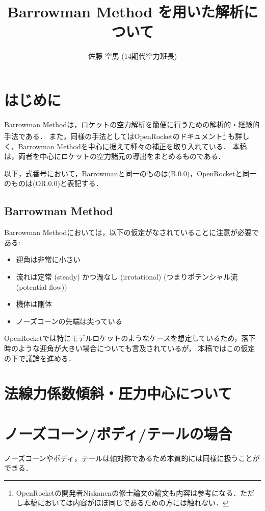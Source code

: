 \documentclass[uplatex,dvipdfmx,a4j,11pt]{jsarticle}
\title{Barrowman Method を用いた解析について}
\date{}
\author{佐藤 空馬 (14期代空力班長)}
\begin{document}
\maketitle
\thispagestyle{mypagestyle}%

\section{はじめに}
Barrowman Method\cite{Barrowman}は，ロケットの空力解析を簡便に行うための解析的・経験的手法である．
また，同様の手法としてはOpenRocketのドキュメント\cite{OpenRocket1}\footnote{OpenRocketの開発者Niskanenの修士論文\cite{OpenRocket2}の論文も内容は参考になる．ただし本稿においては内容がほぼ同じであるため\cite{OpenRocket2}の方には触れない．}
も詳しく，Barrowman Methodを中心に据えて種々の補正を取り入れている．
本稿は，両者を中心にロケットの空力諸元の導出をまとめるものである．

以下，式番号において，Barrowman\cite{Barrowman}と同一のものは(B.0.0)，OpenRocket\cite{OpenRocket1}と同一のものは(OR.0.0)と表記する．

\subsection{Barrowman Method}
Barrowman Methodにおいては，以下の仮定がなされていることに注意が必要である:
\begin{itemize}
  \item 迎角は非常に小さい
  \item 流れは定常 (steady) かつ渦なし (irrotational) (つまりポテンシャル流 (potential flow))
  \item 機体は剛体
  \item ノーズコーンの先端は尖っている
\end{itemize}
OpenRocketでは特にモデルロケットのようなケースを想定しているため，落下時のような迎角が大きい場合についても言及されているが，
本稿ではこの仮定の下で議論を進める．

\section{法線力係数傾斜・圧力中心について}
\section{ノーズコーン/ボディ/テールの場合}
ノーズコーンやボディ，テールは軸対称であるため本質的には同様に扱うことができる．
\end{document}
